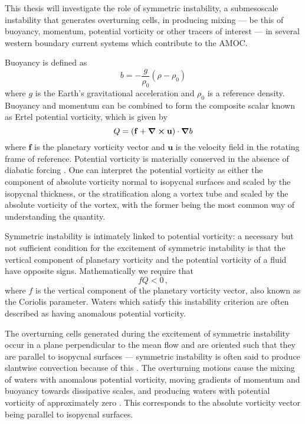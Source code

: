 This thesis will investigate the role of symmetric instability, a submesoscale instability that generates overturning cells, in producing mixing --- be this of buoyancy, momentum, potential vorticity or other tracers of interest --- in several western boundary current systems which contribute to the AMOC.

Buoyancy is defined as
\begin{equation}
    b = -\frac{g}{\rho_{0}}(\rho - \rho_{0})
\end{equation}
where $g$ is the Earth's gravitational acceleration and $\rho_{0}$ is a reference density. Buoyancy and momentum can be combined to form the composite scalar known as Ertel potential vorticity, which is given by
\begin{equation}
    \label{eq:EPV}
    Q = (\mathbf{f} + \curl{\mathbf{u}}) \cdot \grad{b}
\end{equation}
where $\mathbf{f}$ is the planetary vorticity vector and $\mathbf{u}$ is the velocity field in the rotating frame of reference. Potential vorticity is materially conserved in the absence of diabatic forcing \citep{Ertel1942}. One can interpret the potential vorticity as either the component of absolute vorticity normal to isopycnal surfaces and scaled by the isopycnal thickness, or the stratification along a vortex tube and scaled by the absolute vorticity of the vortex, with the former being the most common way of understanding the quantity.

Symmetric instability is intimately linked to potential vorticity: a necessary but not sufficient condition for the excitement of symmetric instability is that the vertical component of planetary vorticity and the potential vorticity of a fluid have opposite signs. Mathematically we require that
\begin{equation}
    \label{eq:PVSI1}
    f Q < 0 \, ,
\end{equation}
where $f$ is the vertical component of the planetary vorticity vector, also known as the Coriolis parameter\footnotemark.
Waters which satisfy this instability criterion are often described as having anomalous potential vorticity.


The overturning cells generated during the excitement of symmetric instability occur in a plane perpendicular to the mean flow and are oriented such that they are parallel to isopycnal surfaces --- symmetric instability is often said to produce slantwise convection because of this \citep[e.g.][]{emanuelSlantwiseConvection1994}. The overturning motions cause the mixing of waters with anomalous potential vorticity, moving gradients of momentum and buoyancy towards dissipative scales, and producing waters with potential vorticity of approximately zero \citep{Taylor2009}. This corresponds to the absolute vorticity vector being parallel to isopycnal surfaces.

